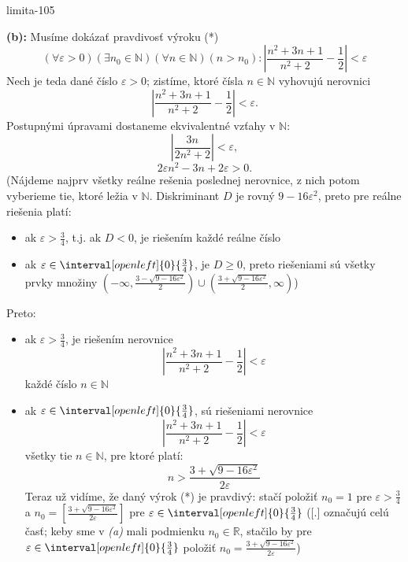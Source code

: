 \begin{defproblem}{limita-105}
\begin{solution}
    \textbf{(b):}
    Musíme dokázať pravdivosť výroku (*)
    \[
        (\forall \varepsilon > 0)
            (\exists n_0 \in \mathbb{N})
                (\forall n \in \mathbb{N})
                    (n > n_0):
                        \left\lvert
                            \frac{n^2+3n+1}{n^2+2}-\frac{1}{2}
                        \right\rvert < \varepsilon
    \]
    Nech je teda dané číslo $\varepsilon > 0$; zistíme, ktoré čísla $n \in
    \mathbb{N}$ vyhovujú nerovnici
    \[
        \left\lvert \frac{n^2 + 3n + 1}{n^2 + 2}-\frac{1}{2} \right\rvert < \varepsilon.
    \]
    Postupnými úpravami dostaneme ekvivalentné vzťahy v $\mathbb{N}:$
    \[
        \left\lvert \frac{3n}{2n^2 + 2} \right\rvert < \varepsilon,
    \]
    \[
        2 \varepsilon n^2 - 3n + 2 \varepsilon >0.
    \]
    (Nájdeme najprv všetky reálne rešenia poslednej nerovnice, z nich potom
    vyberieme tie, ktoré ležia v $\mathbb{N}$. Diskriminant $D$ je rovný $9-16
    \varepsilon^2$, preto pre reálne riešenia platí:
    \begin{itemize}
        \item
            ak $\varepsilon > \frac{3}{4}$, t.j. ak $D<0$, je riešením každé
            reálne číslo
        \item
            ak $\varepsilon \in \interval[open left]{0}{\frac{3}{4}}$, je $D \geq 0$, preto
            riešeniami sú všetky prvky množiny
            $(-\infty,\frac{3-\sqrt{9-16\varepsilon^2}}{2}) \cup
            (\frac{3+\sqrt{9-16\varepsilon^2}}{2},\infty)$)
    \end{itemize}
    Preto:
    \begin{itemize}
        \item
            ak $\varepsilon > \frac{3}{4}$, je riešením nerovnice
            \[
                |\frac{n^2 + 3n + 1}{n^2 + 2} - \frac{1}{2}| < \varepsilon
            \]
            každé číslo $n \in \mathbb{N}$
        \item
            ak $\varepsilon \in \interval[open left]{0}{\frac{3}{4}}$, sú
            riešeniami nerovnice
            \[
                |\frac{n^2 + 3n + 1}{n^2 + 2} - \frac{1}{2}|<\varepsilon
            \]
            všetky tie $n \in \mathbb{N}$, pre ktoré platí:
            \[
                n > \frac{3 + \sqrt{9 - 16\varepsilon^2}}{2\varepsilon}
            \]
            Teraz už vidíme, že daný výrok (*) je pravdivý: stačí položiť $n_0 =
            1$ pre $\varepsilon > \frac{3}{4}$ a $n_0 = [\frac{3 + \sqrt{9 -
            16\varepsilon^2}}{2\varepsilon}]$ pre $\varepsilon \in
            \interval[open left]{0}{\frac{3}{4}}$ ([.] označujú celú časť; keby
            sme v \textit{(a)} mali podmienku $n_0 \in \mathbb{R}$, stačilo by
            pre $\varepsilon \in \interval[open left]{0}{\frac{3}{4}}$ položiť
            $n_0 = \frac{3 + \sqrt{9 - 16\varepsilon^2}}{2\varepsilon}$)
    \end{itemize}


\end{solution}
\end{defproblem}
